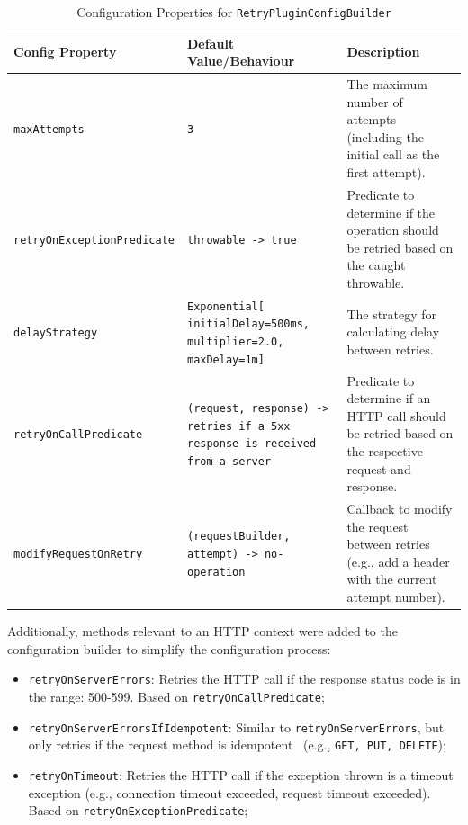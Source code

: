 \begin{table}[!htb]
    \centering
    \caption{Configuration Properties for \texttt{RetryPluginConfigBuilder}}
    \label{tab:retry-ktor-config-builder}
    \vspace{0.3cm}
    \begin{tabular}{|l|p{5cm}|p{6cm}|}
        \hline
        \textbf{Config Property} & \textbf{Default Value/Behaviour} & \textbf{Description} \\ \hline
        \texttt{maxAttempts} & \texttt{3} & The maximum number of attempts
        (including the initial call as the first attempt). \\ \hline
        \texttt{retryOnExceptionPredicate} & \texttt{throwable ->
            true} & Predicate
        to determine if the operation should be retried based on the caught throwable. \\ \hline
        \texttt{delayStrategy} & \texttt{Exponential[ initialDelay=500ms, multiplier=2.0, maxDelay=1m]}          & The strategy
        for calculating delay between retries.                                             \\ \hline
        \texttt{retryOnCallPredicate} & \texttt{(request, response) ->
            retries if a 5xx response is received from a server}
        & Predicate to determine if an HTTP call should be retried based on the respective request and response. \\ \hline
        \texttt{modifyRequestOnRetry} & \texttt{(requestBuilder, attempt) ->
            no-operation} & Callback to modify the request between retries
        (e.g., add a header with the current attempt number). \\ \hline
    \end{tabular}
\end{table}

Additionally, methods relevant to an HTTP context were added to the configuration builder to simplify the configuration process:

\begin{itemize}
    \item \texttt{retryOnServerErrors}: Retries the HTTP call if the response status code is in the range: 500-599.
    Based on \texttt{retryOnCallPredicate};
    \item \texttt{retryOnServerErrorsIfIdempotent}: Similar to \texttt{retryOnServerErrors}, but only retries if the request method is idempotent~\cite{idempotent-http-method} (e.g., \texttt{GET, PUT, DELETE});
    \item \texttt{retryOnTimeout}: Retries the HTTP call if the exception thrown is a timeout exception
    (e.g., connection timeout exceeded, request timeout exceeded). Based on \texttt{retryOnExceptionPredicate};
\end{itemize}
